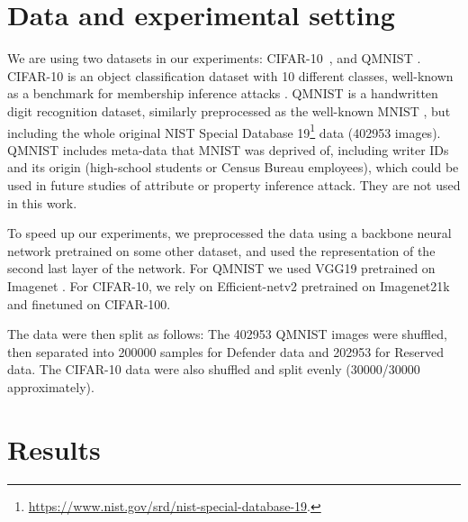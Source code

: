 \documentclass[letterpaper]{article}
\begin{document}
\section{Data and experimental setting}

We are using two datasets in our experiments: CIFAR-10~\cite{krizhevsky2009learning}, and QMNIST \cite{qmnist-2019}. CIFAR-10 is an object classification dataset with 10 different classes, well-known as a benchmark for membership inference attacks \cite{rahman2018membership,hilprecht2019reconstruction,shokri2017membership}.
QMNIST \cite{qmnist-2019} is a handwritten digit recognition dataset, similarly preprocessed as the well-known MNIST \cite{lecun1998gradient}, but including the whole original NIST Special Database 19\footnote{\url{https://www.nist.gov/srd/nist-special-database-19}.} data (402953 images).
QMNIST includes meta-data that MNIST was deprived of, including writer IDs and its origin (high-school students or Census Bureau employees), which could be used in future studies of attribute or property inference attack. They are not used in this work.

To speed up our experiments, we preprocessed the data using a backbone neural network pretrained on some other dataset, and used the representation of the second last layer of the network. For QMNIST we used VGG19 \cite{simonyan2014very} pretrained on Imagenet \cite{deng2009imagenet}.
For CIFAR-10, we rely on Efficient-netv2 \cite{tan2021efficientnetv2} pretrained on Imagenet21k and finetuned on CIFAR-100.

The data were then split as follows:
The 402953 QMNIST images were shuffled, then separated into 200000 samples for Defender data and 202953 for Reserved data.
The CIFAR-10 data were also shuffled and split evenly (30000/30000 approximately).



\section{Results}
\label{sec:results}
\end{document}

